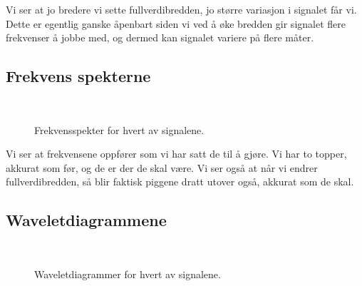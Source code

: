 \documentclass[12pt,norsk,a4paper]{article}
\begin{document}
Vi ser at jo bredere vi sette fullverdibredden, jo større variasjon i signalet får vi. Dette er egentlig ganske åpenbart siden vi ved å øke bredden gir signalet flere frekvenser å jobbe med, og dermed kan signalet variere på flere måter.

\subsection{Frekvens spekterne}

\begin{figure}[H]
\begin{center}
\\ 
\noindent 
{}
\end{center}
\caption[caption]{Frekvensspekter for hvert av signalene.} 
\end{figure}

Vi ser at frekvensene oppfører som vi har satt de til å gjøre. Vi har to topper, akkurat som før, og de er der de skal være. Vi ser også at når vi endrer fullverdibredden, så blir faktisk piggene dratt utover også, akkurat som de skal. 

\subsection{Waveletdiagrammene}

\begin{figure}[H]
\begin{center}
\\ 
\noindent 
{}
\end{center}
\caption[caption]{Waveletdiagrammer for hvert av signalene.} 
\end{figure}
\end{document}
